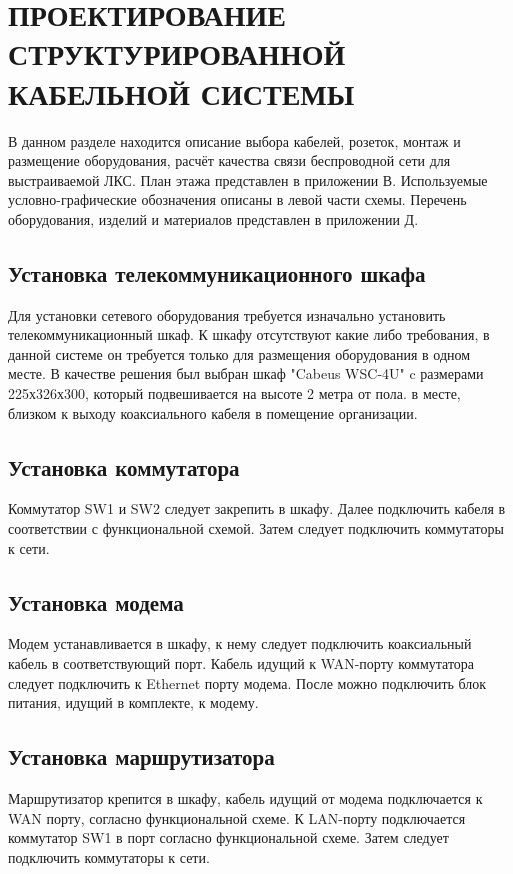 \section{ПРОЕКТИРОВАНИЕ СТРУКТУРИРОВАННОЙ КАБЕЛЬНОЙ СИСТЕМЫ}
\label{sec:dev}

В данном разделе находится описание выбора кабелей, розеток, монтаж и размещение оборудования,
расчёт качества связи беспроводной сети для выстраиваемой ЛКС. План этажа представлен в приложении В. 
Используемые условно-графические обозначения описаны в левой части схемы.
Перечень оборудования, изделий и материалов представлен в приложении Д. 

\subsection{Установка телекоммуникационного шкафа}

Для установки сетевого оборудования требуется изначально установить телекоммуникационный шкаф. 
К шкафу отсутствуют какие либо требования, в данной системе он требуется только для 
размещения оборудования в одном месте. В качестве решения был выбран шкаф "Cabeus WSC-4U" c размерами 225х326х300,
который подвешивается на высоте 2 метра от пола. 
в месте, близком к выходу коаксиального кабеля в помещение  организации.

\subsection{Установка коммутатора}

Коммутатор SW1 и SW2 следует закрепить в шкафу. Далее подключить кабеля в соответствии с функциональной схемой.
Затем следует подключить коммутаторы к сети.

\subsection{Установка модема}

Модем устанавливается в шкафу, к нему следует подключить коаксиальный кабель в соответствующий порт.
Кабель идущий к WAN-порту коммутатора следует подключить к Ethernet порту модема. 
После можно подключить блок питания, идущий в комплекте, к модему.

\subsection{Установка маршрутизатора}

Маршрутизатор крепится в шкафу, кабель идущий от модема подключается к WAN порту, согласно функциональной схеме.
К LAN-порту подключается коммутатор SW1 в порт согласно функциональной схеме. Затем следует подключить коммутаторы к сети.

